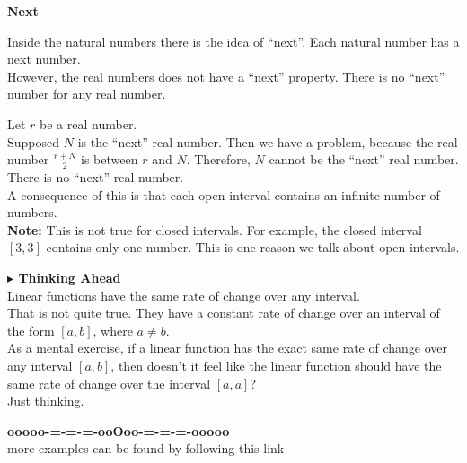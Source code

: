 \documentclass{ximera}
\begin{document}
\begin{idea} \textbf{\textcolor{blue!55!black}{Next}}



Inside the natural numbers there is the idea of ``next''.  Each natural number has a next number. \\


However, the real numbers does not have a ``next'' property.  There is no ``next'' number for any real number.


Let $r$ be a real number. \\

Supposed $N$ is the ``next'' real number.  Then we have a problem, because the real number $\frac{r+N}{2}$ is between $r$ and $N$.  Therefore, $N$ cannot be the ``next'' real number.  There is no ``next'' real number. \\


A consequence of this is that each open interval contains an infinite number of numbers. \\



\textbf{Note: } This is not true for closed intervals.  For example, the closed interval $[3, 3]$ contains only one number.  This is one reason we talk about open intervals.



\end{idea}





\textbf{\textcolor{red!70!black}{$\blacktriangleright$ Thinking Ahead}} \\


Linear functions have the same rate of change over any interval. \\

That is not quite true.  They have a constant rate of change over an interval of the form $[a, b]$, where $a \ne b$. \\

As a mental exercise, if a linear function has the exact same rate of change over any interval $[a, b]$, then doesn't it feel like the linear function should have the same rate of change over the interval $[a, a]$? \\

Just thinking.







\begin{onlineOnly}
\begin{center}
\textbf{\textcolor{green!50!black}{ooooo-=-=-=-ooOoo-=-=-=-ooooo}} \\

more examples can be found by following this link\\ 

\end{center}
\end{onlineOnly}
\end{document}
